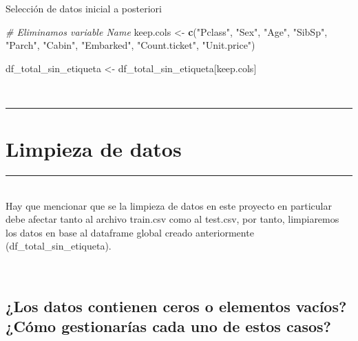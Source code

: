 \documentclass[
]{article}
\newenvironment{Shaded}{\begin{snugshade}}{\end{snugshade}}
\newcommand{\CommentTok}[1]{\textcolor[rgb]{0.56,0.35,0.01}{\textit{#1}}}
\newcommand{\KeywordTok}[1]{\textcolor[rgb]{0.13,0.29,0.53}{\textbf{#1}}}
\newcommand{\NormalTok}[1]{#1}
\newcommand{\StringTok}[1]{\textcolor[rgb]{0.31,0.60,0.02}{#1}}
\begin{document}
Selección de datos inicial a posteriori \texttt{}

\begin{Shaded}
\begin{Highlighting}[]
\CommentTok{# Eliminamos variable Name}
\NormalTok{keep.cols <-}\StringTok{ }\KeywordTok{c}\NormalTok{(}\StringTok{"Pclass"}\NormalTok{, }\StringTok{"Sex"}\NormalTok{, }\StringTok{"Age"}\NormalTok{, }\StringTok{"SibSp"}\NormalTok{, }\StringTok{"Parch"}\NormalTok{, }\StringTok{"Cabin"}\NormalTok{,}
               \StringTok{"Embarked"}\NormalTok{, }\StringTok{"Count.ticket"}\NormalTok{, }\StringTok{"Unit.price"}\NormalTok{)}

\NormalTok{df_total_sin_etiqueta <-}\StringTok{ }\NormalTok{df_total_sin_etiqueta[keep.cols]}
\end{Highlighting}
\end{Shaded}

\texttt{}\\
\texttt{}

\begin{center}\rule{0.5\linewidth}{0.5pt}\end{center}

\hypertarget{limpieza-de-datos}{%
\section{\texorpdfstring{\textbf{Limpieza de
datos}}{Limpieza de datos}}\label{limpieza-de-datos}}

\begin{center}\rule{0.5\linewidth}{0.5pt}\end{center}

\texttt{}\\
Hay que mencionar que se la limpieza de datos en este proyecto en
particular debe afectar tanto al archivo train.csv como al test.csv, por
tanto, limpiaremos los datos en base al dataframe global creado
anteriormente (df\_total\_sin\_etiqueta).

\texttt{}\\
\texttt{}

\hypertarget{los-datos-contienen-ceros-o-elementos-vacuxedos-cuxf3mo-gestionaruxedas-cada-uno-de-estos-casos}{%
\subsection{\texorpdfstring{\textbf{¿Los datos contienen ceros o
elementos vacíos? ¿Cómo gestionarías cada uno de estos
casos?}}{¿Los datos contienen ceros o elementos vacíos? ¿Cómo gestionarías cada uno de estos casos?}}\label{los-datos-contienen-ceros-o-elementos-vacuxedos-cuxf3mo-gestionaruxedas-cada-uno-de-estos-casos}}
\end{document}
